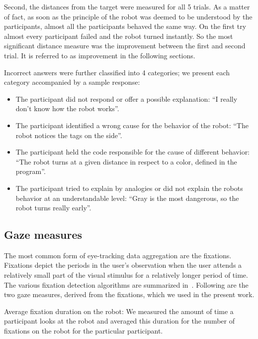 \documentclass{sig-alternate}
\begin{document}
Second, the distances from the target were measured for all 5 trials. As
a matter of fact, as soon as the principle of the robot was deemed to be
understood by the participants, almost all the participants behaved the
same way. On the first try almost every participant failed and the robot
turned instantly. So the most significant distance measure was the
improvement between the first and second trial. It is referred to as
improvement in the following sections.

Incorrect answers were further classified into 4 categories; we present
each category accompanied by a sample response:

\begin{itemize}
    \item The participant did not respond or offer a possible explanation: ``I
        really don't know how the robot works''.

    \item The participant identified a wrong cause for the behavior of the robot:
        ``The robot notices the tags on the side''.

    \item The participant held the code responsible for the cause of different
        behavior: ``The robot turns at a given distance in respect to a color,
        defined in the program''.

    \item The participant tried to explain by analogies or did not explain the
        robots behavior at an understandable level: ``Gray is the most
        dangerous, so the robot turns really early''.

\end{itemize}

\subsection{Gaze measures}

The most common form of eye-tracking data aggregation are the fixations.
Fixations depict the periods in the user's observation when the user
attends a relatively small part of the visual stimulus for a relatively
longer period of time. The various fixation detection algorithms are
summarized in~\cite{duchowski2007eye}. Following are the two gaze measures, derived
from the fixations, which we used in the present work.

Average fixation duration on the robot: We measured the amount of time a
participant looks at the robot and averaged this duration for the number
of fixations on the robot for the particular participant.
\end{document}
